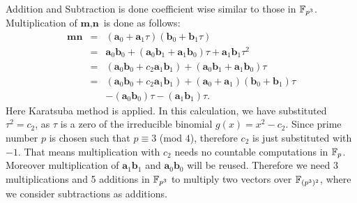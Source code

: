 Addition and Subtraction is done coefficient wise similar to those in $\mathbb{F}_{p^3}$. Multiplication of $\textbf{m},\textbf{n}$ is done as follows:
\begin{eqnarray}\label{eq:mul__Fp_3_2}
\textbf{mn} & = & (\textbf{a}_0+\textbf{a}_1\tau)(\textbf{b}_0+\textbf{b}_1\tau)\nonumber\\
& = & \textbf{a}_0 \textbf{b}_0 + (\textbf{a}_0 \textbf{b}_1+\textbf{a}_1 \textbf{b}_0)\tau + \textbf{a}_1\textbf{b}_1\tau^2 \nonumber \\ 
& = &(\textbf{a}_0 \textbf{b}_0 + c_2 \textbf{a}_1 \textbf{b}_1)+ (\textbf{a}_0 \textbf{b}_1+\textbf{a}_1 \textbf{b}_0)\tau  \label{eq:mul_Fp_3_2a}\\ 
& = &(\textbf{a}_0 \textbf{b}_0 + c_2 \textbf{a}_1 \textbf{b}_1) + (\textbf{a}_0 +\textbf{a}_1)( \textbf{b}_0 +\textbf{b}_1)\tau \nonumber \\ 
&    &  - (\textbf{a}_0\textbf{b}_0)\tau - (\textbf{a}_1\textbf{b}_1)\tau.
\end{eqnarray}
Here Karatsuba method \cite{Karatsuba} is applied. In this calculation, we have substituted $\tau^2 = c_2$, as $\tau$ is a zero of the irreducible binomial $g(x)=x^2-c_2$. Since prime number $p$ is chosen such that $p \equiv 3$ (mod $4$), therefore $c_2$  is just substituted with $-1$. That means  multiplication with $c_2$ needs no countable computations in $\mathbb{F}_p$. Moreover multiplication of $\textbf{a}_1\textbf{b}_1$ and $\textbf{a}_0\textbf{b}_0$ will be reused. Therefore we need 3 multiplications and 5 additions in $\mathbb{F}_{p^3}$ to multiply two vectors over $\mathbb{F}_{(p^3)^2}$, where we consider subtractions as additions.

